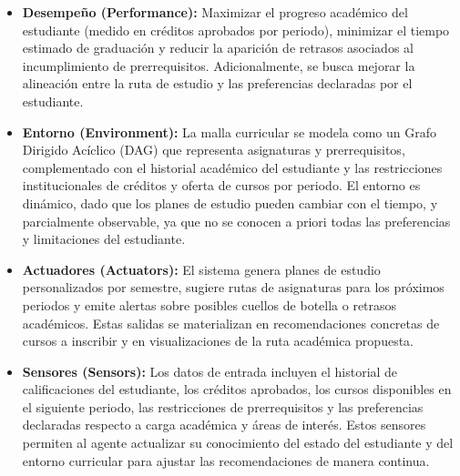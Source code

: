 \begin{itemize}
    \item \textbf{Desempeño (Performance):} Maximizar el progreso académico del estudiante (medido en créditos aprobados por periodo), minimizar el tiempo estimado de graduación y reducir la aparición de retrasos asociados al incumplimiento de prerrequisitos. Adicionalmente, se busca mejorar la alineación entre la ruta de estudio y las preferencias declaradas por el estudiante.

    \item \textbf{Entorno (Environment):} La malla curricular se modela como un Grafo Dirigido Acíclico (DAG) que representa asignaturas y prerrequisitos, complementado con el historial académico del estudiante y las restricciones institucionales de créditos y oferta de cursos por periodo. El entorno es dinámico, dado que los planes de estudio pueden cambiar con el tiempo, y parcialmente observable, ya que no se conocen a priori todas las preferencias y limitaciones del estudiante.

    \item \textbf{Actuadores (Actuators):} El sistema genera planes de estudio personalizados por semestre, sugiere rutas de asignaturas para los próximos periodos y emite alertas sobre posibles cuellos de botella o retrasos académicos. Estas salidas se materializan en recomendaciones concretas de cursos a inscribir y en visualizaciones de la ruta académica propuesta.

    \item \textbf{Sensores (Sensors):} Los datos de entrada incluyen el historial de calificaciones del estudiante, los créditos aprobados, los cursos disponibles en el siguiente periodo, las restricciones de prerrequisitos y las preferencias declaradas respecto a carga académica y áreas de interés. Estos sensores permiten al agente actualizar su conocimiento del estado del estudiante y del entorno curricular para ajustar las recomendaciones de manera continua.
\end{itemize}